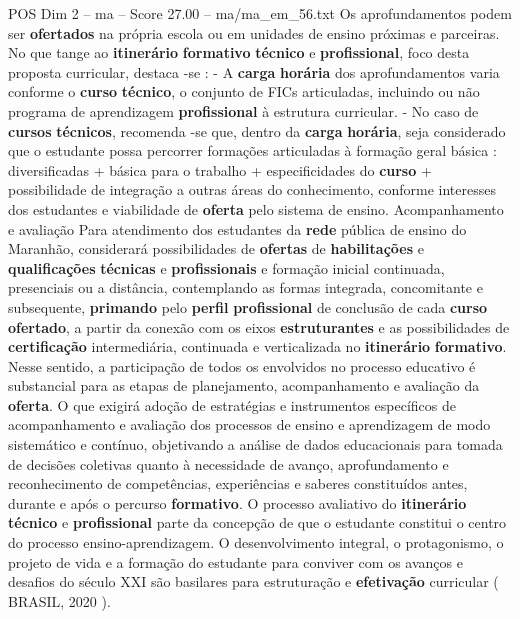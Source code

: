 \begin{textsample}{POS Dim 2 – ma – Score 27.00 – ma/ma\_em\_56.txt}
Os aprofundamentos podem ser \textbf{ofertados} na própria escola ou em unidades de ensino próximas e parceiras.
No que tange ao \textbf{itinerário} \textbf{formativo} \textbf{técnico} e \textbf{profissional}, foco desta proposta curricular, destaca -se : - A \textbf{carga} \textbf{horária} dos aprofundamentos varia conforme o \textbf{curso} \textbf{técnico}, o conjunto de FICs articuladas, incluindo ou não programa de aprendizagem \textbf{profissional} à estrutura curricular. - No caso de \textbf{cursos} \textbf{técnicos}, recomenda -se que, dentro da \textbf{carga} \textbf{horária}, seja considerado que o estudante possa percorrer formações articuladas à formação geral básica : diversificadas + básica para o trabalho + especificidades do \textbf{curso} + possibilidade de integração a outras áreas do conhecimento, conforme interesses dos estudantes e viabilidade de \textbf{oferta} pelo sistema de ensino.
Acompanhamento e avaliação Para atendimento dos estudantes da \textbf{rede} pública de ensino do Maranhão, considerará possibilidades de \textbf{ofertas} de \textbf{habilitações} e \textbf{qualificações} \textbf{técnicas} e \textbf{profissionais} e formação inicial continuada, presenciais ou a distância, contemplando as formas integrada, concomitante e subsequente, \textbf{primando} pelo \textbf{perfil} \textbf{profissional} de conclusão de cada \textbf{curso} \textbf{ofertado}, a partir da conexão com os eixos \textbf{estruturantes} e as possibilidades de \textbf{certificação} intermediária, continuada e verticalizada no \textbf{itinerário} \textbf{formativo}.
Nesse sentido, a participação de todos os envolvidos no processo educativo é substancial para as etapas de planejamento, acompanhamento e avaliação da \textbf{oferta}.
O que exigirá adoção de estratégias e instrumentos específicos de acompanhamento e avaliação dos processos de ensino e aprendizagem de modo sistemático e contínuo, objetivando a análise de dados educacionais para tomada de decisões coletivas quanto à necessidade de avanço, aprofundamento e reconhecimento de competências, experiências e saberes constituídos antes, durante e após o percurso \textbf{formativo}.
O processo avaliativo do \textbf{itinerário} \textbf{técnico} e \textbf{profissional} parte da concepção de que o estudante constitui o centro do processo ensino-aprendizagem.
O desenvolvimento integral, o protagonismo, o projeto de vida e a formação do estudante para conviver com os avanços e desafios do século XXI são basilares para estruturação e \textbf{efetivação} curricular ( BRASIL, 2020 ).

\end{textsample}
